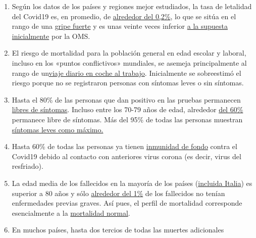 \begin{enumerate}
\def\labelenumi{\arabic{enumi}.}
\tightlist
\item
  Según los datos de los países y regiones mejor estudiados, la tasa de
  letalidad del Covid19 es, en promedio, de
  \href{https://swprs.org/studies-on-covid-19-lethality/}{alrededor del
  0,2\%}, lo que se sitúa en el rango de una
  \href{https://www.ebm-netzwerk.de/en/publications/covid-19}{gripe
  fuerte} y es unas veinte veces inferior
  \href{https://www.businessinsider.com/coronavirus-death-rate-by-age-countries-2020-3}{a
  la supuesta inicialmente} por la OMS.
\item
  El riesgo de mortalidad para la población general en edad escolar y
  laboral, incluso en los «puntos conflictivos» mundiales, se asemeja
  principalmente al rango de
  un\href{https://www.medrxiv.org/content/10.1101/2020.04.05.20054361v1}{viaje
  diario en coche al trabajo}. Inicialmente se sobreestimó el riesgo
  porque no se registraron personas con síntomas leves o sin síntomas.
\item
  Hasta el 80\% de las personas que dan positivo en las pruebas
  permanecen \href{https://www.bmj.com/content/369/bmj.m1375}{libres de
  síntomas}. Incluso entre los 70-79 años de edad, alrededor
  \href{https://www.niid.go.jp/niid/en/2019-ncov-e/9407-covid-dp-fe-01.html}{del
  60\%} permanece libre de síntomas. Más del 95\% de todas las personas
  muestran
  \href{https://thehill.com/opinion/healthcare/494034-the-data-are-in-stop-the-panic-and-end-the-total-isolation}{síntomas
  leves como máximo.}
\item
  Hasta 60\% de todas las personas ya tienen
  \href{https://www.cell.com/cell/fulltext/S0092-8674(20)30610-3}{inmunidad
  de fondo} contra el Covid19 debido al contacto con anteriores virus
  corona (es decir, virus del resfriado).
\item
  La edad media de los fallecidos en la mayoría de los países
  (\href{https://www.epicentro.iss.it/coronavirus/sars-cov-2-decessi-italia}{incluida
  Italia}) es superior a 80 años y sólo
  \href{https://www.bloomberg.com/news/articles/2020-03-18/99-of-those-who-died-from-virus-had-other-illness-italy-says}{alrededor
  del 1\%} de los fallecidos no tenían enfermedades previas graves. Así
  pues, el perfil de mortalidad corresponde esencialmente a la
  \href{https://www.vienna.at/analyse-zeigt-covid-19-opferkurve-entspricht-normaler-mortalitaet/6581246}{mortalidad
  normal}.
\item
  En muchos países, hasta dos tercios de todas las muertes adicionales

\end{enumerate}
